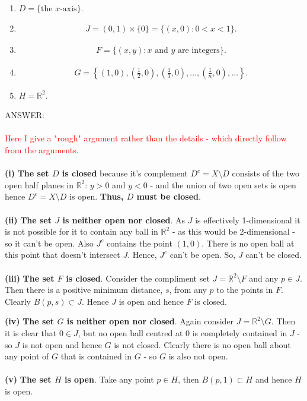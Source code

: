 \documentclass[12pt]{article}
\begin{document}
\begin{enumerate}[label=\roman*)]

\item $D=\{\text{the $x$-axis}\}$.

\item
\begin{align*}
J=(0,1)\times\{0\}=\{(x,0):0<x<1\}.
\end{align*}

\item
\begin{align*}
F=\{(x,y):x\text{ and }y\text{ are integers}\}.
\end{align*}

\item
\begin{align*}
G=\left\{(1,0),\left(\frac12,0\right),\left(\frac13,0\right),\ldots,
\left(\frac1n,0\right),\ldots\right\}.
\end{align*}
\item $H=\mathbb{R}^2$.
\end{enumerate}
\vspace{1cm}
\noindent
ANSWER:\\
\\
\textcolor{red}{Here I give a "rough" argument rather than the details - which directly follow from the arguments.}\\
\\
\textbf{(i)} \textbf{The set $D$ is closed} because it's complement $D^c = X \setminus D$ consists of the two open
half planes in $\mathbb{R}^2$: $y > 0$ and $y < 0$ - and the union of two open sets is open hence $D^c = X \setminus D$ is open.
\textbf{Thus, $D$ must be closed}.\\
\\
\textbf{(ii)} \textbf{The set $J$ is neither open nor closed}.  As $J$ is effectively 1-dimensional it is not possible for it to contain any ball 
in $\mathbb{R}^2$ - as this would be 2-dimensional - so it can't be open.  Also $J^c$ contains the point $(1, 0)$.  There is no open ball at this point that doesn't intersect $J$.
Hence, $J^c$ can't be open.  So, $J$ can't be closed.\\
\\
\textbf{(iii)} \textbf{The set $F$ is closed}.  Consider the compliment set $J = \mathbb{R}^2 \setminus F$ and any $p \in J$.  Then there is a positive minimum distance, $s$, from any $p$ to the points
in $F$.  Clearly $B(p, s) \subset J$.  Hence $J$ is open and hence $F$ is closed.

\newpage
\noindent
\textbf{(iv)} \textbf{The set $G$ is neither open nor closed}.  Again consider $J = \mathbb{R}^2 \setminus G$.  Then it is clear that $0 \in J$, but no open ball centred at $0$ is
completely contained in $J$ - so $J$ is not open and hence $G$ is not closed.  Clearly there is no open ball about any point of $G$ that is contained in $G$ - so $G$ is also 
not open. \\
\\
\textbf{(v)} \textbf{The set $H$ is open}. Take any point $p \in H$, then $B(p,1) \subset H$ and hence $H$ is open.
\end{document}
